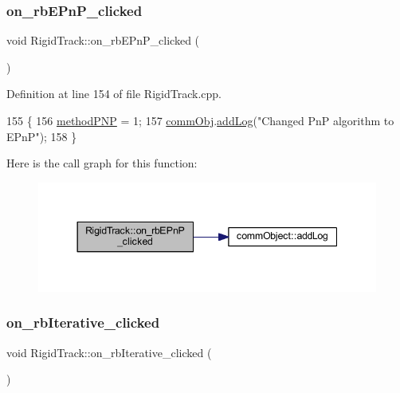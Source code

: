 \subsubsection{\texorpdfstring{on\+\_\+rb\+E\+Pn\+P\+\_\+clicked}{on\_rbEPnP\_clicked}}
{\footnotesize\ttfamily void Rigid\+Track\+::on\+\_\+rb\+E\+Pn\+P\+\_\+clicked (\begin{DoxyParamCaption}{ }\end{DoxyParamCaption})\hspace{0.3cm}{\ttfamily [slot]}}



Definition at line 154 of file Rigid\+Track.\+cpp.


\begin{DoxyCode}
155 \{
156     \hyperlink{main_8cpp_ab5e634b66221f494504aea1557af5df9}{methodPNP} = 1;
157     \hyperlink{main_8cpp_af29e7fc07ae0979d5fb61b473241d33d}{commObj}.\hyperlink{classcomm_object_aec354c7099b3039083cc4224e071e022}{addLog}(\textcolor{stringliteral}{"Changed PnP algorithm to EPnP"});
158 \}
\end{DoxyCode}
Here is the call graph for this function\+:
\nopagebreak
\begin{figure}[H]
\begin{center}
\leavevmode
\includegraphics[width=344pt]{class_rigid_track_a19bc46333f946e589184eeed998160da_cgraph}
\end{center}
\end{figure}
\mbox{\label{class_rigid_track_ae5bcdd3fb7203b4a7d1fa97c1460af31}} 
\subsubsection{\texorpdfstring{on\+\_\+rb\+Iterative\+\_\+clicked}{on\_rbIterative\_clicked}}
{\footnotesize\ttfamily void Rigid\+Track\+::on\+\_\+rb\+Iterative\+\_\+clicked (\begin{DoxyParamCaption}{ }\end{DoxyParamCaption})\hspace{0.3cm}{\ttfamily [slot]}}



